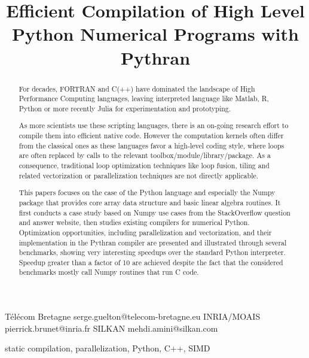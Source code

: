 \documentclass[10pt, preprint]{sigplanconf}
\begin{document}
\title{Efficient Compilation of High Level Python Numerical Programs with Pythran}

           {T{\'e}l{\'e}com Bretagne}
           {serge.guelton@telecom-bretagne.eu}
           {INRIA/MOAIS}
           {pierrick.brunet@inria.fr}
           {SILKAN}
           {mehdi.amini@silkan.com}

\maketitle

\begin{abstract}

    For decades, FORTRAN and C(++) have dominated the landscape of High
    Performance Computing languages, leaving interpreted language like Matlab,
    R, Python or more recently Julia for experimentation and prototyping.

    As more scientists use these scripting languages, there is an on-going
    research effort to compile them into efficient native code. However the
    computation kernels often differ from the classical ones as these languages
    favor a high-level coding style, where loops are often replaced by calls
    to the relevant toolbox/module/library/package. As a consequence, traditional
    loop optimization techniques like loop fusion, tiling and related
    vectorization or parallelization techniques are not directly applicable.

    This papers focuses on the case of the Python language and especially the
    Numpy package that provides core array data structure and basic linear
    algebra routines. It first conducts a case study based on Numpy use
    cases from the StackOverflow question and answer website, then studies
    existing compilers for numerical Python. Optimization opportunities,
    including parallelization and vectorization, and their implementation in
    the Pythran compiler are presented and illustrated through several
    benchmarks, showing very interesting speedups over the standard Python
    interpreter. Speedup greater than a factor of 10 are achieved despite the
    fact that the considered benchmarks mostly call Numpy routines that run C code.

\end{abstract}


\keywords
static compilation, parallelization, Python, C++, SIMD
\end{document}
